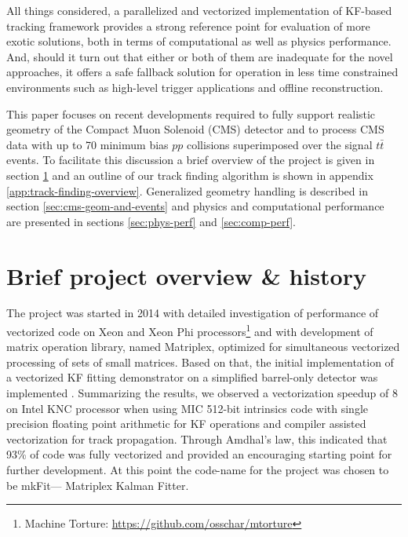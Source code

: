 \documentclass{webofc}
\def\mkfit{mkFit\xspace}
\begin{document}
All things considered, a parallelized and vectorized implementation of KF-based
tracking framework provides a strong reference point for evaluation of
more exotic solutions, both in terms of computational as well as physics
performance. And, should it turn out that either or both of them are
inadequate for the novel approaches, it offers a safe fallback solution for
operation in less time constrained environments such as high-level trigger
applications and offline reconstruction.

This paper focuses on recent developments required to fully support realistic
geometry of the Compact Muon Solenoid (CMS) detector and to process CMS data
with up to 70 minimum bias $pp$ collisions superimposed over the signal $t\bar{t}$
events. To facilitate this discussion a brief overview of the project is given
in section \ref{sec:project-overview} and an outline of our track finding
algorithm is shown in appendix \ref{app:track-finding-overview}. Generalized
geometry handling is described in section \ref{sec:cms-geom-and-events} and
physics and computational performance are presented in sections
\ref{sec:phys-perf} and \ref{sec:comp-perf}.


\section{Brief project overview \& history}
\label{sec:project-overview}

The project was started in 2014 with detailed investigation of performance of
vectorized code on Xeon and Xeon Phi processors\footnote{Machine Torture:
  \url{https://github.com/osschar/mtorture}} and with development of matrix
operation library, named Matriplex, optimized for simultaneous vectorized
processing of sets of small matrices. Based on that, the initial
implementation of a vectorized KF fitting demonstrator on a simplified
barrel-only detector was implemented \cite{pkf-fit}. Summarizing the results,
we observed a vectorization speedup of 8 on Intel KNC processor when using MIC
512-bit intrinsics code with single precision floating point arithmetic for KF
operations and compiler assisted vectorization for track propagation. Through
Amdhal's law, this indicated that 93\% of code was fully vectorized and
provided an encouraging starting point for further development. At this point
the code-name for the project was chosen to be \mkfit --- Matriplex Kalman
Fitter.
\end{document}
